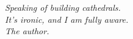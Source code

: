 \cleardoublepage
\thispagestyle{empty}
\markboth{}{}%
\vspace*{1.6in}
{\raggedleft\large\itshape
Speaking of building cathedrals.\\[0.45em]
It's ironic, and I am fully aware.\\[0.9em]
The author.\par}
\vfill
